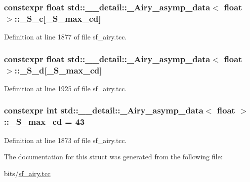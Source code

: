 \subsubsection[{\texorpdfstring{\+\_\+\+S\+\_\+c}{_S_c}}]{\setlength{\rightskip}{0pt plus 5cm}constexpr float {\bf std\+::\+\_\+\+\_\+detail\+::\+\_\+\+Airy\+\_\+asymp\+\_\+data}$<$ float $>$\+::\+\_\+\+S\+\_\+c\mbox{[}{\bf \+\_\+\+S\+\_\+max\+\_\+cd}\mbox{]}\hspace{0.3cm}{\ttfamily [static]}}\hypertarget{structstd_1_1____detail_1_1__Airy__asymp__data_3_01float_01_4_a8fc68acdbcbc59f4ecfdd4bc2f4f2a1e}{}\label{structstd_1_1____detail_1_1__Airy__asymp__data_3_01float_01_4_a8fc68acdbcbc59f4ecfdd4bc2f4f2a1e}


Definition at line 1877 of file sf\+\_\+airy.\+tcc.

\subsubsection[{\texorpdfstring{\+\_\+\+S\+\_\+d}{_S_d}}]{\setlength{\rightskip}{0pt plus 5cm}constexpr float {\bf std\+::\+\_\+\+\_\+detail\+::\+\_\+\+Airy\+\_\+asymp\+\_\+data}$<$ float $>$\+::\+\_\+\+S\+\_\+d\mbox{[}{\bf \+\_\+\+S\+\_\+max\+\_\+cd}\mbox{]}\hspace{0.3cm}{\ttfamily [static]}}\hypertarget{structstd_1_1____detail_1_1__Airy__asymp__data_3_01float_01_4_ad947443d5860fcd25d25ad6d04ea3bb3}{}\label{structstd_1_1____detail_1_1__Airy__asymp__data_3_01float_01_4_ad947443d5860fcd25d25ad6d04ea3bb3}


Definition at line 1925 of file sf\+\_\+airy.\+tcc.

\subsubsection[{\texorpdfstring{\+\_\+\+S\+\_\+max\+\_\+cd}{_S_max_cd}}]{\setlength{\rightskip}{0pt plus 5cm}constexpr int {\bf std\+::\+\_\+\+\_\+detail\+::\+\_\+\+Airy\+\_\+asymp\+\_\+data}$<$ float $>$\+::\+\_\+\+S\+\_\+max\+\_\+cd = 43\hspace{0.3cm}{\ttfamily [static]}}\hypertarget{structstd_1_1____detail_1_1__Airy__asymp__data_3_01float_01_4_ac0e59b83a90623587f20cdc32a9e7565}{}\label{structstd_1_1____detail_1_1__Airy__asymp__data_3_01float_01_4_ac0e59b83a90623587f20cdc32a9e7565}


Definition at line 1873 of file sf\+\_\+airy.\+tcc.



The documentation for this struct was generated from the following file\+:\begin{DoxyCompactItemize}
\item 
bits/\hyperlink{sf__airy_8tcc}{sf\+\_\+airy.\+tcc}\end{DoxyCompactItemize}
